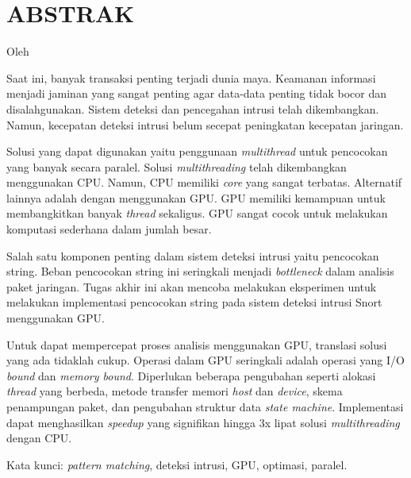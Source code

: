 \chapter*{ABSTRAK}

\begin{center}
\MakeTextUppercase{\textbf{\large{\thetitle}}}

Oleh

\MakeTextUppercase{\theauthor}
\end{center}
\medskip
\begin{spacing}{1.0}

Saat ini, banyak transaksi penting terjadi dunia maya. Keamanan informasi menjadi jaminan yang sangat penting agar data-data penting tidak bocor dan disalahgunakan. Sistem deteksi dan pencegahan intrusi telah dikembangkan. Namun, kecepatan deteksi intrusi belum secepat peningkatan kecepatan jaringan.

Solusi yang dapat digunakan yaitu penggunaan \emph{multithread} untuk pencocokan yang banyak secara paralel. Solusi \emph{multithreading} telah dikembangkan menggunakan CPU. Namun, CPU memiliki \emph{core} yang sangat terbatas. Alternatif lainnya adalah dengan menggunakan GPU. GPU memiliki kemampuan untuk membangkitkan banyak \emph{thread} sekaligus. GPU sangat cocok untuk melakukan komputasi sederhana dalam jumlah besar. 

Salah satu komponen penting dalam sistem deteksi intrusi yaitu pencocokan string. Beban pencocokan string ini seringkali menjadi \emph{bottleneck} dalam analisis paket jaringan. Tugas akhir ini akan mencoba melakukan eksperimen untuk melakukan implementasi pencocokan string pada sistem deteksi intrusi Snort menggunakan GPU.

Untuk dapat mempercepat proses analisis menggunakan GPU, translasi solusi yang ada tidaklah cukup. Operasi dalam GPU seringkali adalah operasi yang I/O \emph{bound} dan \emph{memory bound}. Diperlukan beberapa pengubahan seperti alokasi \emph{thread} yang berbeda, metode transfer memori \emph{host} dan \emph{device}, skema penampungan paket, dan pengubahan struktur data \emph{state machine}. Implementasi dapat menghasilkan \emph{speedup} yang signifikan hingga 3x lipat solusi \emph{multithreading} dengan CPU.

Kata kunci: \textit{pattern matching}, deteksi intrusi, GPU, optimasi, paralel.


\end{spacing}

\clearpage